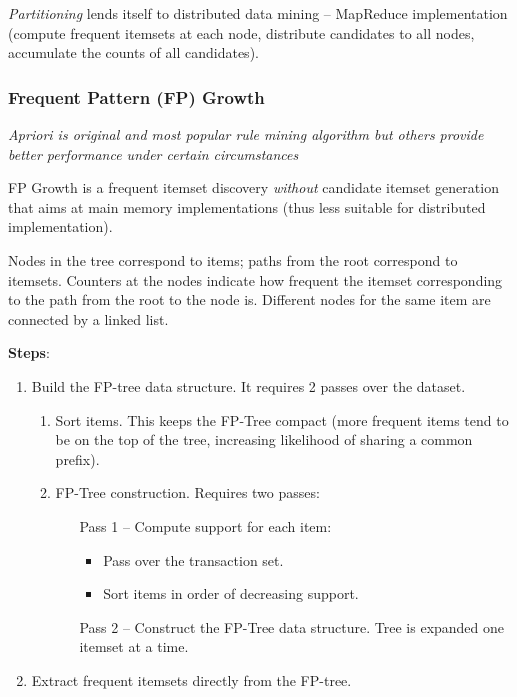     \emph{Partitioning} lends itself to distributed data mining -- MapReduce implementation (compute frequent itemsets at each node, distribute candidates to all nodes, accumulate the counts of all candidates).

  \subsubsection{Frequent Pattern (FP) Growth} %
  \label{ssub:fp_growth}
    \emph{Apriori is original and most popular rule mining algorithm but others provide better performance under certain circumstances}

    FP Growth is a frequent itemset discovery \emph{without} candidate itemset generation that aims at main memory implementations (thus less suitable for distributed implementation).

    Nodes in the tree correspond to items; paths from the root correspond to itemsets. Counters at the nodes indicate how frequent the itemset corresponding to the path from the root to the node is. Different nodes for the same item are connected by a linked list.

    \textbf{Steps}:
    \begin{enumerate}
      \item Build the FP-tree data structure. It requires 2 passes over the dataset.
      \begin{enumerate}
        \item Sort items. This keeps the FP-Tree compact (more frequent items tend to be on the top of the tree, increasing likelihood of sharing a common prefix).
        \item FP-Tree construction. Requires two passes:
        \begin{itemize}
          \item[Pass 1] -- Compute support for each item:
          \begin{itemize}
            \item Pass over the transaction set.
            \item Sort items in order of decreasing support.
          \end{itemize}
          \item[Pass 2] -- Construct the FP-Tree data structure. Tree is expanded one itemset at a time.
        \end{itemize}
      \end{enumerate}
      \item Extract frequent itemsets directly from the FP-tree.
    \end{enumerate}

